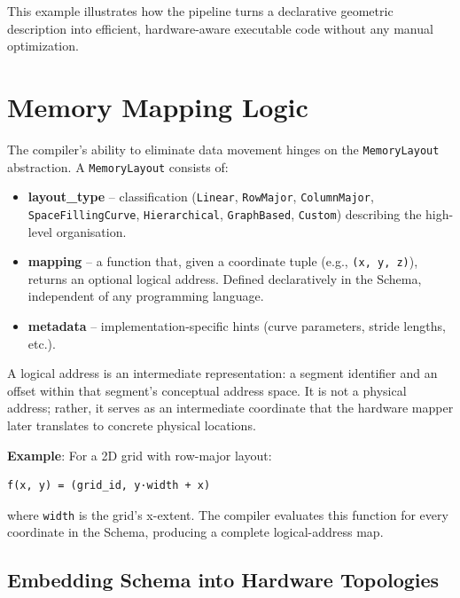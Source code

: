 \documentclass[
  a4paper,
  DIV=11,
  numbers=noendperiod]{scrartcl}
\providecommand{\tightlist}{%
  \setlength{\itemsep}{0pt}\setlength{\parskip}{0pt}}
\begin{document}
This example illustrates how the pipeline turns a declarative geometric
description into efficient, hardware-aware executable code without any
manual optimization.

\section{Memory Mapping Logic}\label{memory-mapping-logic}

The compiler's ability to eliminate data movement hinges on the
\texttt{MemoryLayout} abstraction. A \texttt{MemoryLayout} consists of:

\begin{itemize}
\tightlist
\item
  \textbf{layout\_type} -- classification (\texttt{Linear},
  \texttt{RowMajor}, \texttt{ColumnMajor}, \texttt{SpaceFillingCurve},
  \texttt{Hierarchical}, \texttt{GraphBased}, \texttt{Custom})
  describing the high-level organisation.
\item
  \textbf{mapping} -- a function that, given a coordinate tuple (e.g.,
  \texttt{(x,\ y,\ z)}), returns an optional logical address. Defined
  declaratively in the Schema, independent of any programming language.
\item
  \textbf{metadata} -- implementation-specific hints (curve parameters,
  stride lengths, etc.).
\end{itemize}

A logical address is an intermediate representation: a segment
identifier and an offset within that segment's conceptual address space.
It is not a physical address; rather, it serves as an intermediate
coordinate that the hardware mapper later translates to concrete
physical locations.

\textbf{Example}: For a 2D grid with row-major layout:

\begin{verbatim}
f(x, y) = (grid_id, y·width + x)
\end{verbatim}

where \texttt{width} is the grid's x-extent. The compiler evaluates this
function for every coordinate in the Schema, producing a complete
logical-address map.

\subsection{Embedding Schema into Hardware
Topologies}\label{embedding-schema-into-hardware-topologies}
\end{document}
